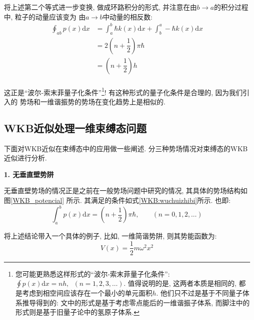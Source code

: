 \documentclass[a4paper, 11pt]{article}
\begin{document}
\begin{spacing}{1.2}
          将上述第二个等式进一步变换, 做成环路积分的形式, 并注意在由$b\to{}a$的积分过程中, 粒子的动量应该变为
          由$a\to{}b$中动量的相反数:
          \begin{equation}
            \begin{aligned}
              \oint_{ab}p(x)\mathrm{d}x &= \int_a^b\hbar{}k(x)\mathrm{d}x + \int_b^a-\hbar{}k(x)\mathrm{d}x \\
                                        &= 2\left(n+\dfrac{1}{2}\right)\pi\hbar \\
                                        &= \left(n+\dfrac{1}{2}\right)h\\
            \end{aligned}
          \end{equation}

          这正是``波尔-索末菲量子化条件''\footnote{您可能更熟悉这样形式的``波尔-索末菲量子化条件'':
          $\oint{}p(x)\mathrm{d}x=nh,\;\;(n=1,2,3,\ldots)$.
          值得说明的是, 这两者本质是相同的, 都是考虑到相空间应该存在一个最小的单元面积$h$.
          他们只不过是基于不同量子体系推导得到的: 文中的形式是基于考虑零点能后的一维谐振子体系, 
          而脚注中的形式则是基于旧量子论中的氢原子体系.}! 有这种形式的量子化条件是合理的, 因为我们引入的
          势场和一维谐振势的势场在变化趋势上是相似的. 

      \subsection{WKB近似处理一维束缚态问题}
        
        下面对WKB近似在束缚态中的应用做一些阐述. 
        分三种势场情况对束缚态的WKB近似进行分析. 

        \textbf{1. 无垂直壁势阱}

        无垂直壁势场的情况正是之前在一般势场问题中研究的情况, 其具体的势场结构如图\ref{WKB_potencial}
        所示. 其满足的条件如式\eqref{WKB:wuchuizhibi}所示. 
        也即:
        \begin{equation}
          \label{WKB:sbwxssj}
          \int_a^bp(x)\mathrm{d}x= \left(n+\dfrac{1}{2}\right)\pi\hbar,
           \;\;\;\;\;\;\;(n=0,1,2,\ldots)
        \end{equation}

        将上述结论带入一个具体的例子, 比如, 一维简谐势阱, 则其势能函数为:
        \begin{equation}
          V(x) = \dfrac{1}{2}m\omega^2x^2
        \end{equation}
        

\end{spacing}
\end{document}
